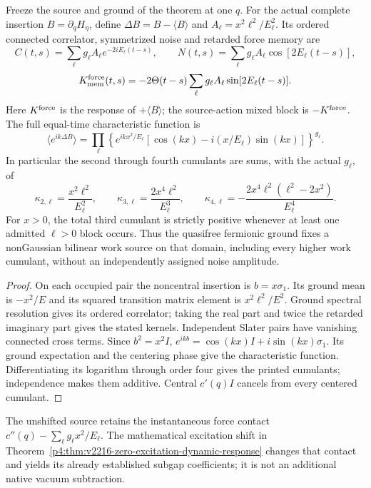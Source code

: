 \documentclass[12pt,a4paper]{article}
\begin{document}
\begin{corollary}
\label{p4:cor:v247-native-source-work-cumulants}
Freeze the source and ground of the theorem at one $q$. For the actual
complete insertion $B=\partial_qH_\eta$, define
$\Delta B=B-\langle B\rangle$ and
$A_\ell=x^2\ell^2/E_\ell^2$. Its ordered connected correlator,
symmetrized noise and retarded force memory are
\[
 \boxed{C(t,s)=\sum_\ell g_\ell A_\ell
                e^{-2iE_\ell(t-s)},\qquad
 N(t,s)=\sum_\ell g_\ell A_\ell
                \cos[2E_\ell(t-s)],}
\]
\[
 K^{\rm force}_{\rm mem}(t,s)
 =-2\Theta(t-s)\sum_\ell g_\ell A_\ell
                  \sin[2E_\ell(t-s)].
\]
Here $K^{\rm force}$ is the response of $+\langle B\rangle$;
the source-action mixed block is $-K^{\rm force}$.
The full equal-time characteristic function is
\[
 \boxed{\langle e^{ik\Delta B}\rangle
 =\prod_\ell\left\{
 e^{ikx^2/E_\ell}
 [\cos(kx)-i(x/E_\ell)\sin(kx)]\right\}^{g_\ell}.}
\]
In particular the second through fourth cumulants are sums, with the
actual $g_\ell$, of
\[
 \boxed{\kappa_{2,\ell}=\frac{x^2\ell^2}{E_\ell^2},\qquad
 \kappa_{3,\ell}=\frac{2x^4\ell^2}{E_\ell^3},\qquad
 \kappa_{4,\ell}=-\frac{2x^4\ell^2(\ell^2-2x^2)}{E_\ell^4}.}
\]
For $x>0$, the total third cumulant is strictly positive whenever
at least one admitted $\ell>0$ block occurs. Thus the quasifree
fermionic ground fixes a nonGaussian bilinear work source on that
domain, including every higher work cumulant, without an independently
assigned noise amplitude.
\end{corollary}
\begin{proof}
On each occupied pair the noncentral insertion is $b=x\sigma_1$.
Its ground mean is $-x^2/E$ and its squared transition matrix element
is $x^2\ell^2/E^2$. Ground spectral resolution gives its ordered
correlator; taking the real part and twice the retarded imaginary part
gives the stated kernels. Independent Slater pairs have vanishing
connected cross terms. Since $b^2=x^2I$,
$e^{ikb}=\cos(kx)I+i\sin(kx)\sigma_1$.
Its ground expectation and the centering phase give the characteristic
function. Differentiating its logarithm through order four gives the
printed cumulants; independence makes them additive. Central
$c'(q)I$ cancels from every centered cumulant.
\end{proof}
The unshifted source retains the instantaneous force contact
$c''(q)-\sum_\ell g_\ell x^2/E_\ell$.
The mathematical excitation shift in
Theorem~\ref{p4:thm:v2216-zero-excitation-dynamic-response} changes
that contact and yields its already established subgap coefficients;
it is not an additional native vacuum subtraction.
\end{document}
